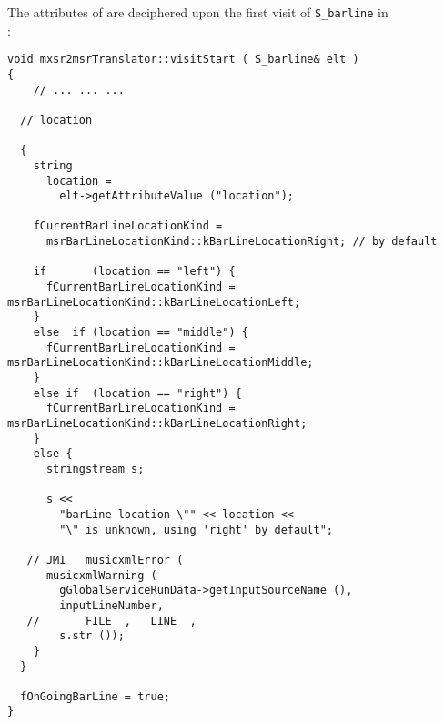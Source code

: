 The attributes of  are deciphered upon the first visit of {\tt S_barline} in\\
:%
\begin{lstlisting}[language=CPlusPlus]
void mxsr2msrTranslator::visitStart ( S_barline& elt )
{
	// ... ... ...

  // location

  {
    string
      location =
        elt->getAttributeValue ("location");

    fCurrentBarLineLocationKind =
      msrBarLineLocationKind::kBarLineLocationRight; // by default

    if       (location == "left") {
      fCurrentBarLineLocationKind = msrBarLineLocationKind::kBarLineLocationLeft;
    }
    else  if (location == "middle") {
      fCurrentBarLineLocationKind = msrBarLineLocationKind::kBarLineLocationMiddle;
    }
    else if  (location == "right") {
      fCurrentBarLineLocationKind = msrBarLineLocationKind::kBarLineLocationRight;
    }
    else {
      stringstream s;

      s <<
        "barLine location \"" << location <<
        "\" is unknown, using 'right' by default";

   // JMI   musicxmlError (
      musicxmlWarning (
        gGlobalServiceRunData->getInputSourceName (),
        inputLineNumber,
   //     __FILE__, __LINE__,
        s.str ());
    }
  }

  fOnGoingBarLine = true;
}
\end{lstlisting}

